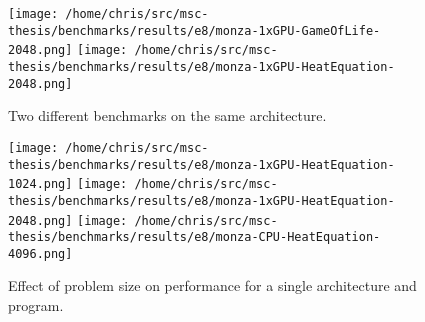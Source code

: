 \begin{table}
\scriptsize

\end{table}



\begin{figure}
\texttt{[image: /home/chris/src/msc-thesis/benchmarks/results/e8/monza-1xGPU-GameOfLife-2048.png]}
\texttt{[image: /home/chris/src/msc-thesis/benchmarks/results/e8/monza-1xGPU-HeatEquation-2048.png]}
\caption{%
  Two different benchmarks on the same architecture.%
}
\end{figure}

\begin{figure}
\texttt{[image: /home/chris/src/msc-thesis/benchmarks/results/e8/monza-1xGPU-HeatEquation-1024.png]}
\texttt{[image: /home/chris/src/msc-thesis/benchmarks/results/e8/monza-1xGPU-HeatEquation-2048.png]}
\texttt{[image: /home/chris/src/msc-thesis/benchmarks/results/e8/monza-CPU-HeatEquation-4096.png]}
\caption{%
  Effect of problem size on performance for a single architecture and program.%
}
\end{figure}

